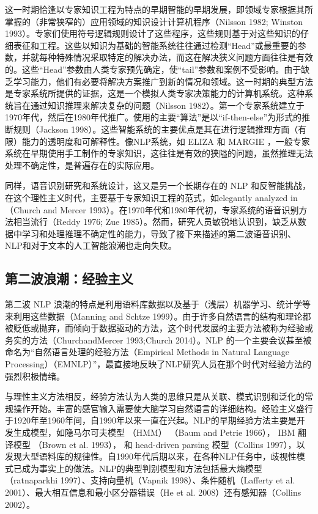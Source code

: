 这一时期恰逢以专家知识工程为特点的早期智能的早期发展，即领域专家根据其所掌握的（非常狭窄的）应用领域的知识设计计算机程序（Nilsson
1982; Winston
1993）。专家们使用符号逻辑规则设计了这些程序，这些规则基于对这些知识的仔细表征和工程。这些以知识为基础的智能系统往往通过检测``Head''或最重要的参数，并就每种特殊情况采取特定的解决办法，而这在解决狭义问题方面往往是有效的。这些``Head''参数由人类专家预先确定，使``tail''参数和案例不受影响。由于缺乏学习能力，他们有必要将解决方案推广到新的情况和领域。这一时期的典型方法是专家系统所提供的证据，这是一个模拟人类专家决策能力的计算机系统。这种系统旨在通过知识推理来解决复杂的问题（Nilsson
1982）。第一个专家系统建立于1970年代，然后在1980年代推广。使用的主要``算法''是以``if-then-else''为形式的推断规则（Jackson
1998）。这些智能系统的主要优点是其在进行逻辑推理方面（有限）能力的透明度和可解释性。像NLP系统，如
ELIZA 和 MARGIE
，一般专家系统在早期使用手工制作的专家知识，这往往是有效的狭隘的问题，虽然推理无法处理不确定性，是普遍存在的实际应用。

同样，语音识别研究和系统设计，这又是另一个长期存在的 NLP
和反智能挑战，在这个理性主义时代，主要基于专家知识工程的范式，如elegantly
analyzed in（Church and Mercer
1993）。在1970年代和1980年代初，专家系统的语音识别方法相当流行（Reddy
1976; Zue
1985）。然而，研究人员敏锐地认识到，缺乏从数据中学习和处理推理不确定性的能力，导致了接下来描述的第二波语音识别、NLP和对于文本的人工智能浪潮也走向失败。

\subsection{第二波浪潮：经验主义}\label{ux7b2cux4e8cux6ce2ux6d6aux6f6eux7ecfux9a8cux4e3bux4e49}

第二波 NLP
浪潮的特点是利用语料库数据以及基于（浅层）机器学习、统计学等来利用这些数据（Manning
and Schtze
1999）。由于许多自然语言的结构和理论都被贬低或抛弃，而倾向于数据驱动的方法，这个时代发展的主要方法被称为经验或务实的方法（ChurchandMercer
1993;Church 2014）。NLP
的一个主要会议甚至被命名为``自然语言处理的经验方法（Empirical Methods in
Natural Language
Processing）（EMNLP）''，最直接地反映了NLP研究人员在那个时代对经验方法的强烈积极情绪。

与理性主义方法相反，经验方法认为人类的思维只是从关联、模式识别和泛化的常规操作开始。丰富的感官输入需要使大脑学习自然语言的详细结构。经验主义盛行于1920年至1960年间，自1990年以来一直在兴起。NLP的早期经验方法主要是开发生成模型，如隐马尔可夫模型
（HMM） （Baum and Petrie 1966）， IBM 翻译模型 （Brown et al. 1993），
和 head-driven parsing 模型（Collins
1997），以发现大型语料库的规律性。自1990年代后期以来，在各种NLP任务中，歧视性模式已成为事实上的做法。NLP的典型判别模型和方法包括最大熵模型（ratnaparkhi
1997）、支持向量机（Vapnik 1998）、条件随机（Lafferty et al.
2001）、最大相互信息和最小区分器错误（He et al.
2008）还有感知器（Collins 2002）。

